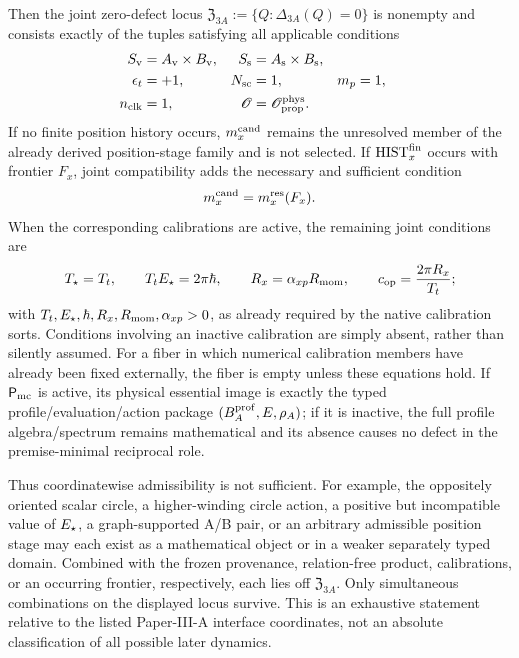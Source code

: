\documentclass[12pt,a4paper]{article}
\begin{document}
\begin{theorem}
Then the joint zero-defect locus
\(\mathfrak Z_{3A}:=\{Q:\Delta_{3A}(Q)=0\}\) is nonempty and consists
exactly of the tuples satisfying all applicable conditions
\begin{align}
 S_{\rm v}&=A_{\rm v}\times B_{\rm v},
 &S_{\rm s}&=A_{\rm s}\times B_{\rm s},
 \label{p3a:eq:joint-locus-products}\\
 \epsilon_t&=+1,
 &N_{\rm sc}&=1,
 &m_p&=1,
 \label{p3a:eq:joint-locus-provenance}\\
 n_{\rm clk}&=1,
 &\mathscr O&=\mathscr O_{\rm prop}^{\rm phys}.
 \label{p3a:eq:joint-locus-clock}
\end{align}
If no finite position history occurs, \(m_x^{\rm cand}\) remains the unresolved member
of the already derived position-stage family and is not selected.  If
\(\mathrm{HIST}_x^{\rm fin}\) occurs with frontier \(F_x\), joint
compatibility adds the necessary and sufficient condition
\begin{equation}
 m_x^{\rm cand}=m_x^{\rm res}(F_x).
 \label{p3a:eq:joint-locus-frontier}
\end{equation}
When the corresponding calibrations are active, the remaining joint
conditions are
\begin{equation}
 T_\star=T_t,
 \qquad T_tE_\star=2\pi\hbar,
 \qquad R_x=\alpha_{xp}R_{\mathrm{mom}},
 \qquad c_{\rm op}=\frac{2\pi R_x}{T_t};
 \label{p3a:eq:joint-locus-calibrations}
\end{equation}
with \(T_t,E_\star,\hbar,R_x,R_{\mathrm{mom}},\alpha_{xp}>0\), as already required by
the native calibration sorts.  Conditions involving an inactive calibration are simply absent, rather than
silently assumed.  For a fiber in which numerical calibration members have
already been fixed externally, the fiber is empty unless these equations hold.
If \(\mathsf P_{\rm mc}\) is active, its physical essential image is exactly
the typed profile/evaluation/action package
\((B_A^{\rm prof},E,\rho_A)\); if it is inactive,
the full profile algebra/spectrum remains mathematical and its absence causes
no defect in the premise-minimal reciprocal role.

Thus coordinatewise admissibility is not sufficient.  For example, the
oppositely oriented scalar circle, a higher-winding circle action, a positive
but incompatible value of \(E_\star\), a graph-supported A/B pair, or an
arbitrary admissible position stage may each exist as a mathematical object
or in a weaker separately typed domain.  Combined with the frozen provenance,
relation-free product, calibrations, or an occurring frontier, respectively,
each lies off \(\mathfrak Z_{3A}\).  Only simultaneous combinations on the
displayed locus survive.  This is an exhaustive statement relative to the
listed Paper-III-A interface coordinates, not an absolute classification of
all possible later dynamics.
\end{theorem}
\end{document}
